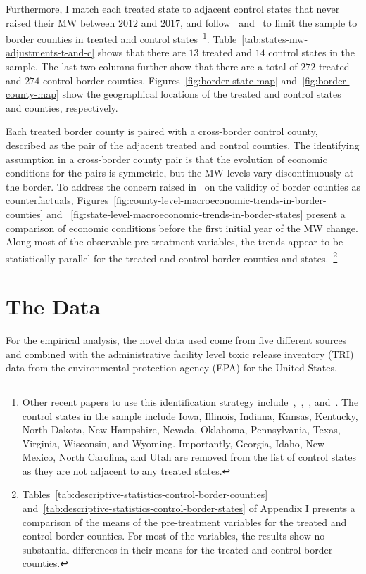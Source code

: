 \documentclass[12pt, english]{article}
\begin{document}
    Furthermore, I match each treated state to adjacent control states that never raised their MW between $2012$ and $2017$, and follow~\cite{dube2010minimum} and~\cite{gopalan2021state} to limit the sample to border counties in treated and control states~\footnote{\tiny Other recent papers to use this identification strategy include~\cite{aaronson2018industry},~\cite{dube2019fairness},~\cite{jardim2018minimum}, and~\cite{zhang2019distributional}. The control states in the sample include Iowa, Illinois, Indiana, Kansas, Kentucky, North Dakota, New Hampshire, Nevada, Oklahoma, Pennsylvania, Texas, Virginia, Wisconsin, and Wyoming. Importantly, Georgia, Idaho, New Mexico, North Carolina, and Utah are removed from the list of control states as they are not adjacent to any treated states.}. Table~\ref{tab:states-mw-adjustments-t-and-c} shows that there are $13$ treated and $14$ control states in the sample. The last two columns further show that there are a total of $272$ treated and $274$ control border counties. Figures~\ref{fig:border-state-map} and~\ref{fig:border-county-map} show the geographical locations of the treated and control states and counties, respectively.
    
    
    Each treated border county is paired with a cross-border control county, described as the pair of the adjacent treated and control counties. The identifying assumption in a cross-border county pair is that the evolution of economic conditions for the pairs is symmetric, but the MW levels vary discontinuously at the border. To address the concern raised in~\cite{neumark2014revisiting} on the validity of border counties as counterfactuals, Figures~\ref{fig:county-level-macroeconomic-trends-in-border-counties} and ~\ref{fig:state-level-macroeconomic-trends-in-border-states} present a comparison of economic conditions before the first initial year of the MW change. Along most of the observable pre-treatment variables, the trends appear to be statistically parallel for the treated and control border counties and states.~\footnote{\tiny Tables~\ref{tab:descriptive-statistics-control-border-counties} and~\ref{tab:descriptive-statistics-control-border-states} of Appendix I presents a comparison of the means of the pre-treatment variables for the treated and control border counties. For most of the variables, the results show no substantial differences in their means for the treated and control border counties.}


    \section{The Data}\label{sec:data}
    For the empirical analysis, the novel data used come from five different sources and combined with the administrative facility level toxic release inventory (TRI) data from the environmental protection agency (EPA) for the United States.
\end{document}
